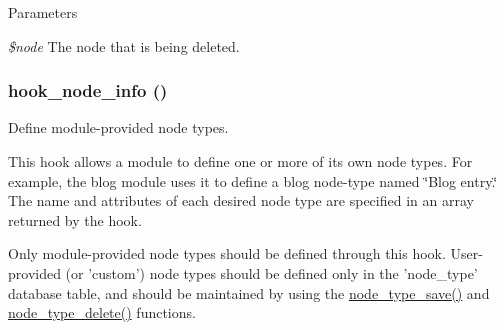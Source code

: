 \begin{DoxyParams}{Parameters}
\item[{\em \$node}]The node that is being deleted. \end{DoxyParams}
\hypertarget{group__node__api__hooks_ga3b6ad51d7815d1cdd093b0e0f350cbd0}{
\subsubsection[{hook\_\-node\_\-info}]{\setlength{\rightskip}{0pt plus 5cm}hook\_\-node\_\-info ()}}
\label{group__node__api__hooks_ga3b6ad51d7815d1cdd093b0e0f350cbd0}
Define module-\/provided node types.

This hook allows a module to define one or more of its own node types. For example, the blog module uses it to define a blog node-\/type named \char`\"{}Blog
 entry.\char`\"{} The name and attributes of each desired node type are specified in an array returned by the hook.

Only module-\/provided node types should be defined through this hook. User-\/ provided (or 'custom') node types should be defined only in the 'node\_\-type' database table, and should be maintained by using the \hyperlink{node_8module_a9a5c06f9903cea586bd44a7d6e9e086c}{node\_\-type\_\-save()} and \hyperlink{node_8module_a7fe2d244b6635513800a027053144425}{node\_\-type\_\-delete()} functions.


